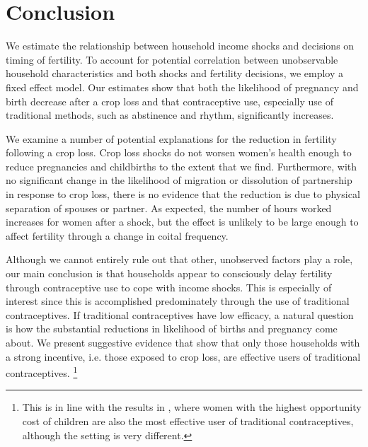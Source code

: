 \documentclass[letterpaper,12pt]{article}
\begin{document}
\section{Conclusion}

We estimate the relationship between household income shocks and decisions
on timing of fertility. 
To account for potential correlation between unobservable household
characteristics and both shocks and fertility decisions, we employ a fixed effect model.
Our estimates show that both the likelihood of pregnancy and birth decrease 
after a crop loss and that contraceptive use, especially use of traditional 
methods, such as abstinence and rhythm, significantly increases. 

We examine a number of potential explanations for the reduction 
in fertility following a crop loss.
Crop loss shocks do not worsen women's health enough to 
reduce pregnancies and childbirths to the extent that we find.
Furthermore, with no significant change in the likelihood of migration or 
dissolution of partnership in response to crop loss, there is no evidence 
that the reduction is due to physical separation of spouses or partner.
As expected, the number of hours worked increases for women after a shock, 
but the effect is unlikely to be large enough to affect fertility 
through a change in coital frequency.

Although we cannot entirely rule out that other, unobserved
factors play a role, our main conclusion is that households appear
to consciously delay fertility through contraceptive use to cope 
with income shocks. 
This is especially of interest since this is accomplished 
predominately through the use of traditional contraceptives.
If traditional contraceptives have low efficacy, a natural question is 
how the substantial reductions in likelihood of births and pregnancy 
come about.
We present suggestive evidence that show that only those households
with a strong incentive, i.e. those exposed to crop loss, are 
effective users of traditional contraceptives.%
\footnote{
This is in line with the results in \cite{Rosenzweig1989},
where women with the highest opportunity cost of children
are also the most effective user of traditional contraceptives,
although the setting is very different.
}
\end{document}
